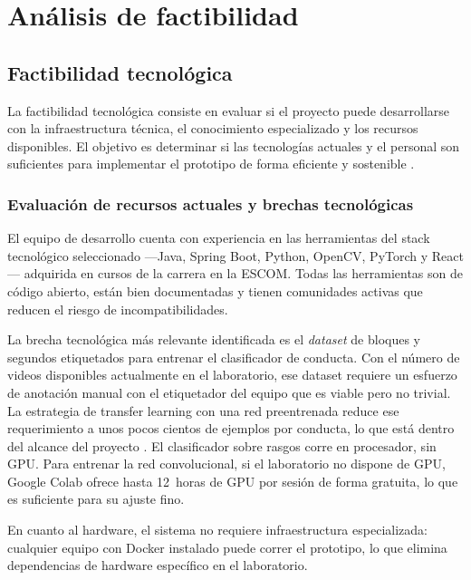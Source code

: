 \section{Análisis de factibilidad}

\subsection{Factibilidad tecnológica}
\label{sec:fact_tecnologica}

La factibilidad tecnológica consiste en evaluar si el proyecto puede desarrollarse con
la infraestructura técnica, el conocimiento especializado y los recursos disponibles.
El objetivo es determinar si las tecnologías actuales y el personal son suficientes para
implementar el prototipo de forma eficiente y sostenible \cite{pressman2014}.

\subsubsection{Evaluación de recursos actuales y brechas tecnológicas}

El equipo de desarrollo cuenta con experiencia en las herramientas del stack tecnológico
seleccionado ---Java, Spring Boot, Python, OpenCV, PyTorch y React--- adquirida en cursos de la
carrera en la ESCOM. Todas las herramientas son de código abierto, están bien
documentadas y tienen comunidades activas que reducen el riesgo de incompatibilidades.

La brecha tecnológica más relevante identificada es el \textit{dataset} de bloques y segundos etiquetados
para entrenar el clasificador de conducta. Con el número de videos disponibles actualmente
en el laboratorio, ese dataset requiere un esfuerzo de anotación manual con el etiquetador del equipo que
es viable pero no trivial. La estrategia de transfer learning con una red preentrenada
reduce ese requerimiento a unos pocos cientos de ejemplos por conducta, lo que está dentro
del alcance del proyecto \cite{pan2010,meng2024_dsaan}. El clasificador sobre rasgos
corre en procesador, sin GPU. Para entrenar la red convolucional, si el laboratorio no
dispone de GPU, Google Colab ofrece hasta 12~horas de GPU por sesión de forma gratuita,
lo que es suficiente para su ajuste fino.

En cuanto al hardware, el sistema no requiere infraestructura
especializada: cualquier equipo con Docker instalado puede correr el prototipo, lo que
elimina dependencias de hardware específico en el laboratorio.


